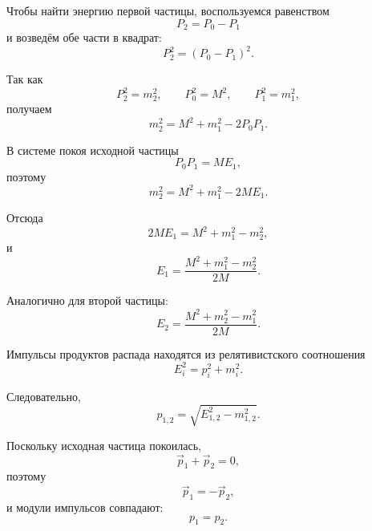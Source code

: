 \documentclass[../final.tex]{subfiles}
\begin{document}
Чтобы найти энергию первой частицы, воспользуемся равенством
%
\begin{equation*}
    P_2=P_0-P_1
\end{equation*}
%
и возведём обе части в квадрат:
%
\begin{equation*}
    P_2^2
    =
    (P_0-P_1)^2.
\end{equation*}

Так как
%
\begin{equation*}
    P_2^2=m_2^2,
    \qquad
    P_0^2=M^2,
    \qquad
    P_1^2=m_1^2,
\end{equation*}
%
получаем
%
\begin{equation*}
    m_2^2
    =
    M^2+m_1^2-2P_0P_1.
\end{equation*}

В системе покоя исходной частицы
%
\begin{equation*}
    P_0P_1
    =
    ME_1,
\end{equation*}
%
поэтому
%
\begin{equation*}
    m_2^2
    =
    M^2+m_1^2-2ME_1.
\end{equation*}

Отсюда
%
\begin{equation*}
    2ME_1
    =
    M^2+m_1^2-m_2^2,
\end{equation*}
%
и
%
\begin{equation*}
    E_1
    =
    \frac{M^2+m_1^2-m_2^2}{2M}.
\end{equation*}

Аналогично для второй частицы:
%
\begin{equation*}
    E_2
    =
    \frac{M^2+m_2^2-m_1^2}{2M}.
\end{equation*}

Импульсы продуктов распада находятся из релятивистского соотношения
%
\begin{equation*}
    E_i^2
    =
    p_i^2+m_i^2.
\end{equation*}

Следовательно,
%
\begin{equation*}
    p_{1,2}
    =
    \sqrt{
        E_{1,2}^2-m_{1,2}^2
    }.
\end{equation*}

Поскольку исходная частица покоилась,
%
\begin{equation*}
    \vec p_1+\vec p_2=0,
\end{equation*}
%
поэтому
%
\begin{equation*}
    \vec p_1=-\vec p_2,
\end{equation*}
%
и модули импульсов совпадают:
%
\begin{equation*}
    p_1=p_2.
\end{equation*}
\end{document}
